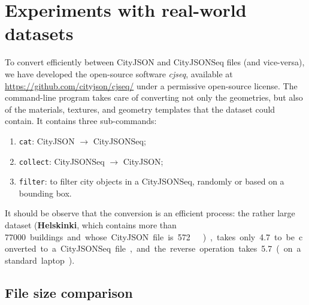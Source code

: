 \documentclass{isprs} %
\begin{document}
%
\section{Experiments with real-world datasets}%
\label{sec:experiments}


To convert efficiently between CityJSON and CityJSONSeq files (and vice-versa), we have developed the open-source software \emph{cjseq}, available at \url{https://github.com/cityjson/cjseq/} under a permissive open-source license.
The command-line program takes care of converting not only the geometries, but also of the materials, textures, and geometry templates that the dataset could contain.
It contains three sub-commands: 
\begin{enumerate}
  \item \texttt{cat}: CityJSON $\rightarrow$ CityJSONSeq;
  \item \texttt{collect}: CityJSONSeq $\rightarrow$ CityJSON;
  \item \texttt{filter}: to filter city objects in a CityJSONSeq, randomly or based on a bounding box.
\end{enumerate}

It should be observe that the conversion is an efficient process: the rather large dataset (\textbf{Helskinki}, which contains more than \qty{77000} buildings and whose CityJSON file is \qty{572}{\mega\byte}), takes only \qty{4.7}{\sec} to be converted to a CityJSONSeq file, and the reverse operation takes \qty{5.7}{\sec} (on a standard laptop).



\subsection{File size comparison}
\end{document}
